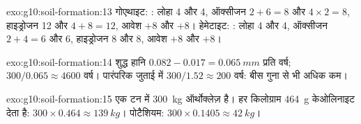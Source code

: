 \begin{solution}{exo:g10:soil-formation:13}
गोएथाइट: : लोहा 4 और 4,
ऑक्सीजन $2 + 6 = 8$ और $4 \times 2 = 8$, हाइड्रोजन 12 और $4 + 8 = 12$, आवेश
$+8$ और $+8$। हेमेटाइट: : लोहा 4
और 4, ऑक्सीजन $2 + 4 = 6$ और 6, हाइड्रोजन 8 और 8, आवेश $+8$ और $+8$।
\end{solution}

\begin{solution}{exo:g10:soil-formation:14}
शुद्ध हानि $0.082 - 0.017 = \qty{0.065}{mm}$ प्रति वर्ष; $300/0.065 \approx 4600$
वर्ष। पारंपरिक जुताई में $300/1.52 \approx 200$ वर्ष: बीस गुना से भी
अधिक कम।
\end{solution}

\begin{solution}{exo:g10:soil-formation:15}
एक टन में \qty{300}{kg} ऑर्थोक्लेज़ है। हर किलोग्राम
\qty{464}{g} केओलिनाइट देता है: $300 \times 0.464 \approx \qty{139}{kg}$। पोटैशियम:
$300 \times 0.1405 \approx \qty{42}{kg}$।
\end{solution}


